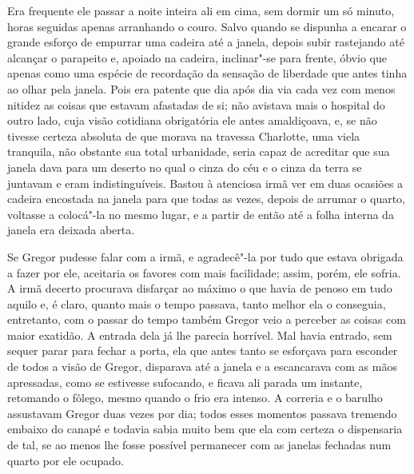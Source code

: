 Era frequente ele passar a noite inteira ali em cima, sem dormir um só
minuto, horas seguidas apenas arranhando o couro. Salvo quando se dispunha
a encarar o grande esforço de empurrar uma cadeira até a janela, depois
subir rastejando até alcançar o parapeito e, apoiado na cadeira,
inclinar"-se para frente, óbvio que apenas como uma espécie de recordação
da sensação de liberdade que antes tinha ao olhar pela janela. Pois era
patente que dia após dia via cada vez com menos nitidez as coisas que
estavam afastadas de si; não avistava mais o hospital do outro lado, cuja
visão cotidiana obrigatória ele antes amaldiçoava, e, se não tivesse
certeza absoluta de que morava na travessa Charlotte, uma viela tranquila,
não obstante sua total urbanidade, seria capaz de acreditar que sua janela
dava para um deserto no qual o cinza do céu e o cinza da terra se juntavam
e eram indistinguíveis. Bastou à atenciosa irmã ver em duas ocasiões a
cadeira encostada na janela para que todas as vezes, depois de arrumar o
quarto, voltasse a colocá"-la no mesmo lugar, e a partir de então até a
folha interna da janela era deixada aberta.

Se Gregor pudesse falar com a irmã, e agradecê"-la por tudo que estava
obrigada a fazer por ele, aceitaria os favores com mais facilidade; assim,
porém, ele sofria. A irmã decerto procurava disfarçar ao máximo o que
havia de penoso em tudo aquilo e, é claro, quanto mais o tempo passava,
tanto melhor ela o conseguia, entretanto, com o passar do tempo também
Gregor veio a perceber as coisas com maior exatidão. A entrada dela já lhe
parecia horrível. Mal havia entrado, sem sequer parar para fechar a porta,
ela que antes tanto se esforçava para esconder de todos a visão de Gregor,
disparava até a janela e a escancarava com as mãos apressadas, como se
estivesse sufocando, e ficava ali parada um instante, retomando o fôlego,
mesmo quando o frio era intenso. A correria e o barulho assustavam Gregor
duas vezes por dia; todos esses momentos passava tremendo embaixo do
canapé e todavia sabia muito bem que ela com certeza o dispensaria de tal,
se ao menos lhe fosse possível permanecer com as janelas fechadas num
quarto por ele ocupado.

